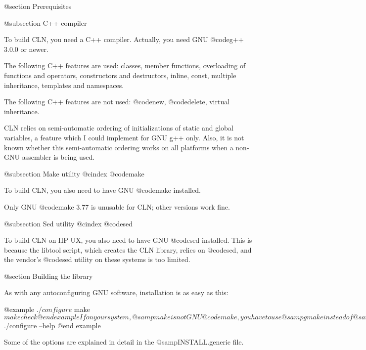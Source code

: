 @section Prerequisites

@subsection C++ compiler

To build CLN, you need a C++ compiler.
Actually, you need GNU @code{g++ 3.0.0} or newer.

The following C++ features are used:
classes, member functions, overloading of functions and operators,
constructors and destructors, inline, const, multiple inheritance,
templates and namespaces.

The following C++ features are not used:
@code{new}, @code{delete}, virtual inheritance.

CLN relies on semi-automatic ordering of initializations of static and
global variables, a feature which I could implement for GNU g++
only. Also, it is not known whether this semi-automatic ordering works
on all platforms when a non-GNU assembler is being used.

@subsection Make utility
@cindex @code{make}

To build CLN, you also need to have GNU @code{make} installed.

Only GNU @code{make} 3.77 is unusable for CLN; other versions work fine.

@subsection Sed utility
@cindex @code{sed}

To build CLN on HP-UX, you also need to have GNU @code{sed} installed.
This is because the libtool script, which creates the CLN library, relies
on @code{sed}, and the vendor's @code{sed} utility on these systems is too
limited.


@section Building the library

As with any autoconfiguring GNU software, installation is as easy as this:

@example
$ ./configure
$ make
$ make check
@end example

If on your system, @samp{make} is not GNU @code{make}, you have to use
@samp{gmake} instead of @samp{make} above.

The @code{configure} command checks out some features of your system and
C++ compiler and builds the @code{Makefile}s. The @code{make} command
builds the library. This step may take about an hour on an average workstation.
The @code{make check} runs some test to check that no important subroutine
has been miscompiled.

The @code{configure} command accepts options. To get a summary of them, try

@example
$ ./configure --help
@end example

Some of the options are explained in detail in the @samp{INSTALL.generic} file.

